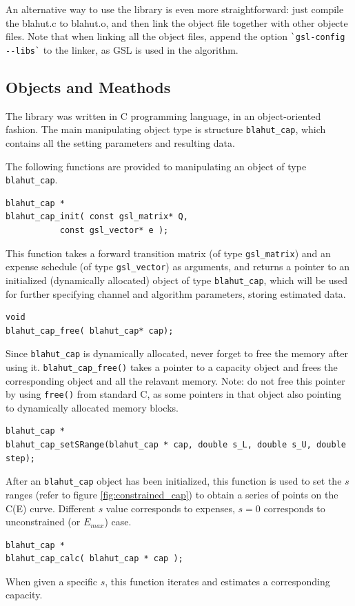 \documentclass[a4paper,10pt]{article}
\begin{document}
An alternative way to use the library is even more straightforward: just compile the blahut.c to blahut.o, and then link the object file together with other objecte files. Note that when linking all the object files, append the option \verb|`gsl-config --libs`| to the linker, as GSL is used in the algorithm.

\subsection{Objects and Meathods}
The library was written in C programming language, in an object-oriented fashion. The main manipulating object type is structure \verb|blahut_cap|, which contains all the setting parameters and resulting data.

The following functions are provided to manipulating an object of type \verb|blahut_cap|.
\begin{verbatim}
blahut_cap * 
blahut_cap_init( const gsl_matrix* Q, 
		   const gsl_vector* e );
\end{verbatim}
This function takes a forward transition matrix (of type \verb|gsl_matrix|) and an expense schedule (of type \verb|gsl_vector|) as arguments, and returns a pointer to an initialized (dynamically allocated) object of type \verb|blahut_cap|, which will be used for further specifying channel and algorithm parameters, storing estimated data.

\begin{verbatim}
void 
blahut_cap_free( blahut_cap* cap);
\end{verbatim}
Since \verb|blahut_cap| is dynamically allocated, never forget to free the memory after using it. \verb|blahut_cap_free()| takes a pointer to a capacity object and frees the corresponding object and all the relavant memory.
Note: do not free this pointer by using \verb|free()| from standard C, as some pointers in that object also pointing to dynamically allocated memory blocks.

\begin{verbatim}
blahut_cap * 
blahut_cap_setSRange(blahut_cap * cap, double s_L, double s_U, double step);
\end{verbatim}
After an \verb|blahut_cap| object has been initialized, this function is used to set the $s$ ranges (refer to figure \ref{fig:constrained_cap}) to obtain a series of points on the C(E) curve. Different $s$ value corresponds to expenses, $s=0$ corresponds to unconstrained (or $E_{max}$) case.

\begin{verbatim}
blahut_cap *
blahut_cap_calc( blahut_cap * cap );
\end{verbatim}
When given a specific $s$, this function iterates and estimates a corresponding capacity.
\end{document}
